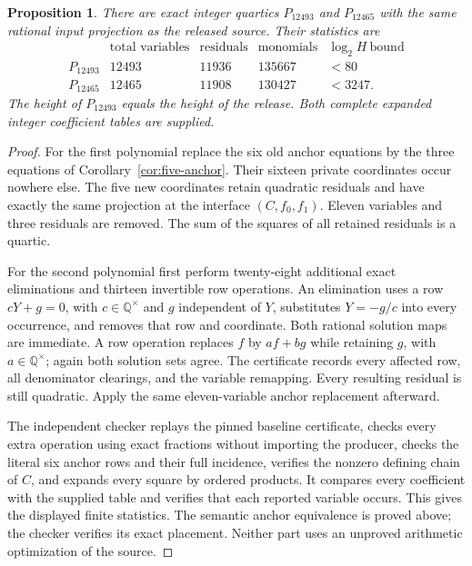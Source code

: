 \documentclass[11pt]{article}
\newtheorem{proposition}[theorem]{Proposition}
\theoremstyle{definition}
\newcommand{\Q}{\mathbb Q}
\begin{document}
\begin{proposition}\label{prop:computed-quartics}
There are exact integer quartics $P_{12493}$ and $P_{12465}$ with
the same rational input projection as the released source. Their
statistics are
\[
\begin{array}{c|r|r|r|r}
 &\text{total variables}&\text{residuals}&\text{monomials}&\log_2 H\ \text{bound}\\\hline
 P_{12493}&12493&11936&135667&<80\\
 P_{12465}&12465&11908&130427&<3247.
\end{array}
\]
The height of $P_{12493}$ equals the height of the release.
Both complete expanded integer coefficient tables are supplied.
\end{proposition}
\begin{proof}
For the first polynomial replace the six old anchor equations by
the three equations of Corollary~\ref{cor:five-anchor}. Their sixteen
private coordinates occur nowhere else. The five new coordinates
retain quadratic residuals and have exactly the same projection at the
interface $(C,f_0,f_1)$. Eleven variables and three residuals are removed.
The sum of the squares of all retained residuals is a quartic.

For the second polynomial first perform twenty-eight additional exact
eliminations and thirteen invertible row operations. An elimination
uses a row $cY+g=0$, with $c\in\Q^\times$ and $g$ independent of
$Y$, substitutes $Y=-g/c$ into every occurrence, and removes that row
and coordinate. Both rational solution maps are immediate. A row
operation replaces $f$ by $af+bg$ while retaining $g$, with
$a\in\Q^\times$; again both solution sets agree. The certificate
records every affected row, all denominator clearings, and the variable
remapping. Every resulting residual is still quadratic. Apply the same
eleven-variable anchor replacement afterward.

The independent checker replays the pinned baseline certificate, checks
every extra operation using exact fractions without importing the
producer, checks the literal six anchor rows and their full incidence,
verifies the nonzero defining chain of $C$, and expands every square
by ordered products. It compares every coefficient with the supplied
table and verifies that each reported variable occurs. This gives the
displayed finite statistics. The semantic anchor equivalence is proved
above; the checker verifies its exact placement. Neither part uses an
unproved arithmetic optimization of the source.
\end{proof}
\end{document}
